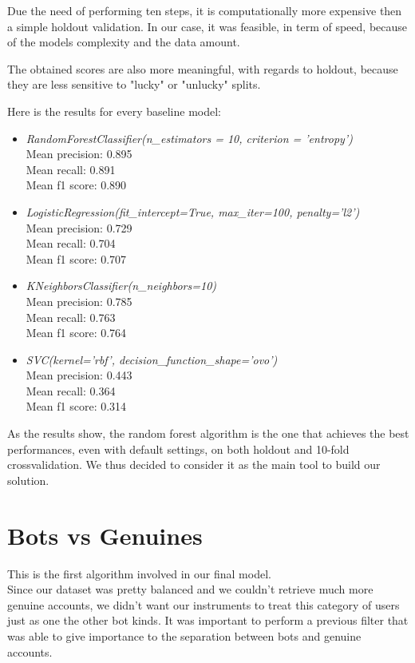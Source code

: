 Due the need of performing ten steps, it is computationally more expensive then a simple holdout validation. In our case, it was feasible, in term of speed, because of the models complexity and the data amount.

The obtained scores are also more meaningful, with regards to holdout, because they are less sensitive to "lucky" or "unlucky" splits.

Here is the results for every baseline model:

\begin{itemize}
	\item[\PencilRight] \textit{RandomForestClassifier(n\_estimators = 10, criterion = 'entropy')}\\
	Mean precision: 0.895\\
	Mean recall: 0.891\\
	Mean f1 score: 0.890
	\item[\PencilRight]\textit{LogisticRegression(fit\_intercept=True, max\_iter=100, penalty='l2')}\\
	Mean precision: 0.729\\
	Mean recall: 0.704\\
	Mean f1 score: 0.707
	\item[\PencilRight]\textit{KNeighborsClassifier(n\_neighbors=10)}\\
	Mean precision: 0.785\\
	Mean recall: 0.763\\
	Mean f1 score: 0.764
	\item[\PencilRight]\textit{SVC(kernel='rbf', decision\_function\_shape='ovo')}\\
	Mean precision: 0.443\\
	Mean recall: 0.364\\
	Mean f1 score: 0.314
\end{itemize}

As the results show, the random forest algorithm is the one that achieves the best performances, even with default settings, on both holdout and 10-fold crossvalidation. We thus decided to consider it as the main tool to build our solution. 

\section{Bots vs Genuines}
This is the first algorithm involved in our final model.\\
Since our dataset was pretty balanced and we couldn't retrieve much more genuine accounts, we didn't want our instruments to treat this category of users just as one the other bot kinds. It was important to perform a previous filter that was able to give importance to the separation between bots and genuine accounts.

